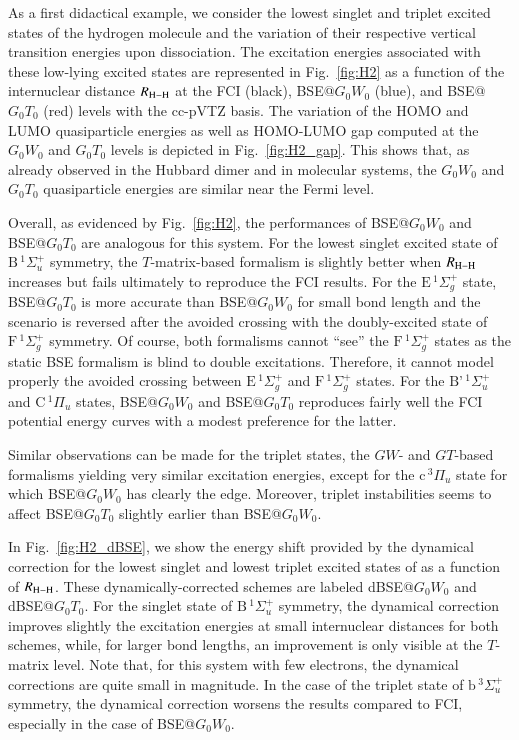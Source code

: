 \documentclass[aip,jcp,reprint,noshowkeys,superscriptaddress]{revtex4-1}
\begin{document}
As a first didactical example, we consider the lowest singlet and triplet excited states of the hydrogen molecule  and the variation of their respective vertical transition energies upon dissociation.
The excitation energies associated with these low-lying excited states are represented in Fig.~\ref{fig:H2} as a function of the internuclear distance $R_{\ce{H-H}}$ at the FCI (black), BSE@$G_0W_0$ (blue), and BSE@$G_0T_0$ (red) levels with the cc-pVTZ basis.
The variation of the HOMO and LUMO quasiparticle energies as well as HOMO-LUMO gap computed at the $G_0W_0$ and $G_0T_0$ levels is depicted in Fig.~\ref{fig:H2_gap}.
This shows that, as already observed in the Hubbard dimer \cite{Romaniello_2012} and in molecular systems, \cite{Zhang_2017} the $G_0W_0$ and $G_0T_0$ quasiparticle energies are similar near the Fermi level.

Overall, as evidenced by Fig.~\ref{fig:H2}, the performances of BSE@$G_0W_0$ and BSE@$G_0T_0$ are analogous for this system.
For the lowest singlet excited state of $\text{B}\,{}^1\Sigma_u^+$ symmetry, the $T$-matrix-based formalism is slightly better when $R_{\ce{H-H}}$ increases but fails ultimately to reproduce the FCI results.
For the $\text{E}\,{}^1\Sigma_g^+$ state, BSE@$G_0T_0$ is more accurate than BSE@$G_0W_0$ for small bond length and the scenario is reversed after the avoided crossing with the doubly-excited state of $\text{F}\,{}^1\Sigma_g^+$ symmetry.
Of course, both formalisms cannot ``see'' the $\text{F}\,{}^1\Sigma_g^+$ states as the static BSE formalism is blind to double excitations.
Therefore, it cannot model properly the avoided crossing between $\text{E}\,{}^1\Sigma_g^+$ and $\text{F}\,{}^1\Sigma_g^+$ states.
For the $\text{B'}\,{}^1\Sigma_u^+$ and $\text{C}\,{}^1\Pi_u$ states, BSE@$G_0W_0$ and BSE@$G_0T_0$ reproduces fairly well the FCI potential energy curves with a modest preference for the latter.

Similar observations can be made for the triplet states, the $GW$- and $GT$-based formalisms yielding very similar excitation energies, except for the $\text{c}\,{}^3\Pi_u$ state for which BSE@$G_0W_0$ has clearly the edge.
Moreover, triplet instabilities seems to affect BSE@$G_0T_0$ slightly earlier than BSE@$G_0W_0$.

In Fig.~\ref{fig:H2_dBSE}, we show the energy shift provided by the dynamical correction for the lowest singlet and lowest triplet excited states of  as a function of $R_{\ce{H-H}}$. 
These dynamically-corrected schemes are labeled dBSE@$G_0W_0$ and dBSE@$G_0T_0$.
For the singlet state of $\text{B}\,{}^1\Sigma_u^+$ symmetry, the dynamical correction improves slightly the excitation energies at small internuclear distances for both schemes, while, for larger bond lengths, an improvement is only visible at the $T$-matrix level.
Note that, for this system with few electrons, the dynamical corrections are quite small in magnitude.
In the case of the triplet state of $\text{b}\,{}^3\Sigma_u^+$ symmetry, the dynamical correction worsens the results compared to FCI, especially in the case of BSE@$G_0W_0$.
\end{document}
